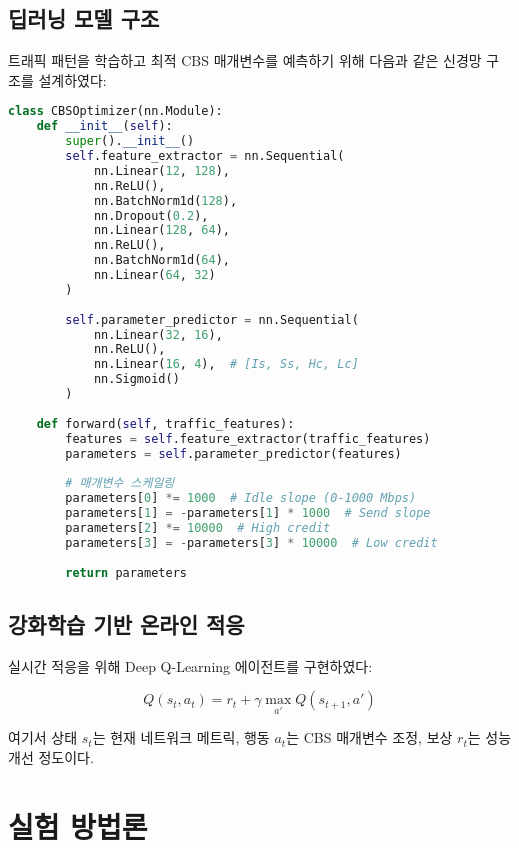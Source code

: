 \documentclass[12pt, a4paper]{article}
\begin{document}
\subsection{딥러닝 모델 구조}

트래픽 패턴을 학습하고 최적 CBS 매개변수를 예측하기 위해 다음과 같은 신경망 구조를 설계하였다:

\begin{lstlisting}[language=Python, caption=CBS 최적화 신경망]
class CBSOptimizer(nn.Module):
    def __init__(self):
        super().__init__()
        self.feature_extractor = nn.Sequential(
            nn.Linear(12, 128),
            nn.ReLU(),
            nn.BatchNorm1d(128),
            nn.Dropout(0.2),
            nn.Linear(128, 64),
            nn.ReLU(),
            nn.BatchNorm1d(64),
            nn.Linear(64, 32)
        )
        
        self.parameter_predictor = nn.Sequential(
            nn.Linear(32, 16),
            nn.ReLU(),
            nn.Linear(16, 4),  # [Is, Ss, Hc, Lc]
            nn.Sigmoid()
        )
    
    def forward(self, traffic_features):
        features = self.feature_extractor(traffic_features)
        parameters = self.parameter_predictor(features)
        
        # 매개변수 스케일링
        parameters[0] *= 1000  # Idle slope (0-1000 Mbps)
        parameters[1] = -parameters[1] * 1000  # Send slope
        parameters[2] *= 10000  # High credit
        parameters[3] = -parameters[3] * 10000  # Low credit
        
        return parameters
\end{lstlisting}

\subsection{강화학습 기반 온라인 적응}

실시간 적응을 위해 Deep Q-Learning 에이전트를 구현하였다:

\begin{equation}
Q(s_t, a_t) = r_t + \gamma \max_{a'} Q(s_{t+1}, a')
\end{equation}

여기서 상태 $s_t$는 현재 네트워크 메트릭, 행동 $a_t$는 CBS 매개변수 조정, 보상 $r_t$는 성능 개선 정도이다.

\section{실험 방법론}
\end{document}
